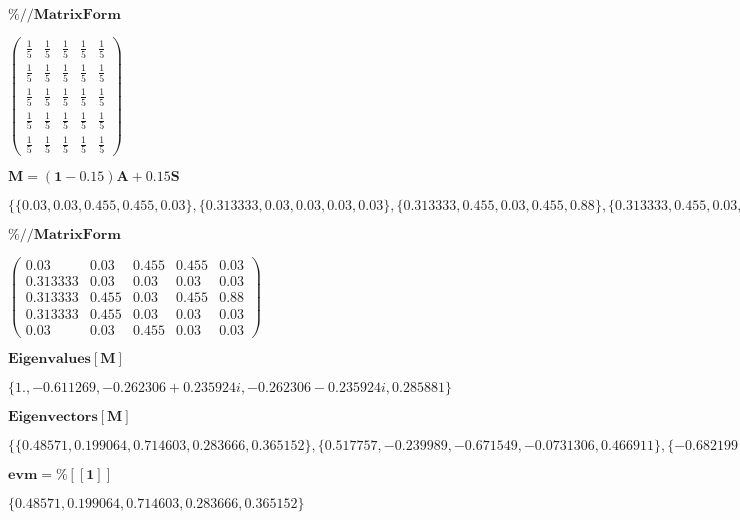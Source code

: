 \documentclass{article}
\begin{document}
\noindent\(\pmb{\%\text{//}\text{MatrixForm}}\)

\noindent\(\left(
\begin{array}{ccccc}
 \frac{1}{5} & \frac{1}{5} & \frac{1}{5} & \frac{1}{5} & \frac{1}{5} \\
 \frac{1}{5} & \frac{1}{5} & \frac{1}{5} & \frac{1}{5} & \frac{1}{5} \\
 \frac{1}{5} & \frac{1}{5} & \frac{1}{5} & \frac{1}{5} & \frac{1}{5} \\
 \frac{1}{5} & \frac{1}{5} & \frac{1}{5} & \frac{1}{5} & \frac{1}{5} \\
 \frac{1}{5} & \frac{1}{5} & \frac{1}{5} & \frac{1}{5} & \frac{1}{5}
\end{array}
\right)\)

\noindent\(\pmb{M=(1-0.15)A+0.15S}\)

\noindent\(\{\{0.03,0.03,0.455,0.455,0.03\},\{0.313333,0.03,0.03,0.03,0.03\},\{0.313333,0.455,0.03,0.455,0.88\},\{0.313333,0.455,0.03,0.03,0.03\},\{0.03,0.03,0.455,0.03,0.03\}\}\)

\noindent\(\pmb{\%\text{//}\text{MatrixForm}}\)

\noindent\(\left(
\begin{array}{ccccc}
 0.03 & 0.03 & 0.455 & 0.455 & 0.03 \\
 0.313333 & 0.03 & 0.03 & 0.03 & 0.03 \\
 0.313333 & 0.455 & 0.03 & 0.455 & 0.88 \\
 0.313333 & 0.455 & 0.03 & 0.03 & 0.03 \\
 0.03 & 0.03 & 0.455 & 0.03 & 0.03
\end{array}
\right)\)

\noindent\(\pmb{\text{Eigenvalues}[M]}\)

\noindent\(\{1.,-0.611269,-0.262306+0.235924 i,-0.262306-0.235924 i,0.285881\}\)

\noindent\(\pmb{\text{Eigenvectors}[M]}\)

\noindent\(\{\{0.48571,0.199064,0.714603,0.283666,0.365152\},\{0.517757,-0.239989,-0.671549,-0.0731306,0.466911\},\{-0.682199+0. i,0.407353+0.366382
i,0.0833974-0.0887608 i,0.33765-0.289938 i,-0.146202+0.0123168 i\},\{-0.682199+0. i,0.407353-0.366382 i,0.0833974+0.0887608 i,0.33765+0.289938 i,-0.146202-0.0123168
i\},\{-0.233368,-0.231287,0.418149,-0.575126,0.621633\}\}\)

\noindent\(\pmb{\text{evm}=\%[[1]]}\)

\noindent\(\{0.48571,0.199064,0.714603,0.283666,0.365152\}\)
\end{document}
